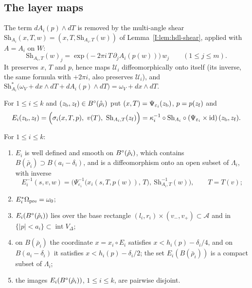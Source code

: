 \subsection{The layer maps}\label{sec:str-layer-maps}

The term $dA_i(p)\wedge dT$ is removed by the multi-angle shear
$\mathrm{Sh}_{A_i}(x,T,w)=(x,T,\mathrm{Sh}_{A_i,T}(w))$ of Lemma~\ref{I:lem:hdl-shear}, applied with $A=A_i$ on $W$:
\[
 \mathrm{Sh}_{A_i,T}(w)_j=\exp\big(-2\pi i\,T\,\partial_jA_i(p(w))\big)\,w_j\qquad(1\le j\le m).
\]
It preserves $x$, $T$ and $p$, hence maps $\mathcal U_i$ diffeomorphically onto itself (its inverse, the same formula with
$+2\pi i$, also preserves $\mathcal U_i$), and
$\mathrm{Sh}_{A_i}^*\big(\omega_V+dx\wedge dT+dA_i(p)\wedge dT\big)=\omega_V+dx\wedge dT$.

\begin{construction}\label{cons:str-layer-map}
For $1\le i\le k$ and $(z_{\rm b},z_{\rm f})\in B^{\circ}(\hat\rho_i)$ put $(x,T)=\Psi_{\varepsilon_i}(z_{\rm b})$, $p=p(z_{\rm f})$ and
\[
 E_i(z_{\rm b},z_{\rm f})=\Big(\sigma_i(x,T,p),\ v(T),\ \mathrm{Sh}_{A_i,T}(z_{\rm f})\Big)
 =\kappa_i^{-1}\circ\mathrm{Sh}_{A_i}\circ(\Psi_{\varepsilon_i}\times\mathrm{id})\,(z_{\rm b},z_{\rm f}) .
\]
\end{construction}

\begin{proposition}\label{prop:str-layer}
For $1\le i\le k$:
\begin{enumerate}[label=(\roman*)]
\item $E_i$ is well defined and smooth on $B^{\circ}(\hat\rho_i)$, which contains $B(\bar\rho_i)\supset B(a_i-\delta_i)$, and is a
diffeomorphism onto an open subset of $\Lambda_i$, with inverse
\[
 E_i^{-1}(s,v,w)=\Big(\Psi_{\varepsilon_i}^{-1}\big(x_i(s,T,p(w)),\,T\big),\ \mathrm{Sh}_{A_i,T}^{-1}(w)\Big),\qquad T=T(v);
\]
\item $E_i^*\Omega_{\rm pre}=\omega_0$;
\item $E_i(B^{\circ}(\hat\rho_i))$ lies over the base rectangle $(l_i,r_i)\times(v_-,v_+)\subset\mathcal A$ and in
$\{|p|<a_i\}\subset\operatorname{int}V_\Delta$;
\item on $B(\bar\rho_i)$ the coordinate $x=x_i\circ E_i$ satisfies $x<h_i(p)-\delta_i/4$, and on $B(a_i-\delta_i)$ it satisfies
$x<h_i(p)-\delta_i/2$; the set $E_i(B(\bar\rho_i))$ is a compact subset of $\Lambda_i$;
\item the images $E_i(B^{\circ}(\hat\rho_i))$, $1\le i\le k$, are pairwise disjoint.
\end{enumerate}
\end{proposition}

